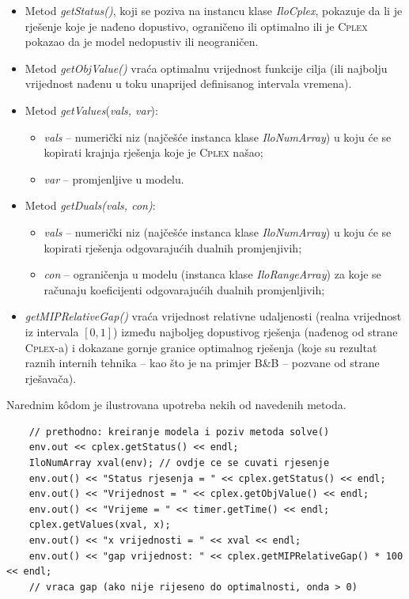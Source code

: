 \documentclass[a4paper, utf8, 11pt, colorlinks]{book}
\theoremstyle{definition}
\begin{document}
\begin{itemize}
	\item Metod \emph{getStatus()}, koji se poziva na instancu klase \emph{IloCplex},  pokazuje da li je rješenje koje je nađeno dopustivo, ograničeno ili optimalno ili je \textsc{Cplex} pokazao da je model nedopustiv ili neograničen.
	\item Metod \emph{getObjValue()} vraća optimalnu vrijednost funkcije cilja (ili najbolju vrijednost nađenu u toku unaprijed definisanog intervala vremena).
	\item Metod \emph{getValues}(\emph{vals, var}): 
	\begin{itemize}
	 	  \item \emph{vals} -- numerički niz (najčešće instanca klase \emph{IloNumArray}) u koju će se kopirati krajnja rješenja koje je \textsc{Cplex} našao;    
          \item \emph{var} -- promjenljive u modelu.
    \end{itemize}
     \item Metod \emph{getDuals(vals, con)}:
     \begin{itemize}
     	\item \emph{vals} -- numerički niz (najčešće instanca klase \emph{IloNumArray}) u koju će se kopirati rješenja odgovarajućih dualnih promjenjivih;
     	\item \emph{con} -- ograničenja u modelu (instanca klase \emph{IloRangeArray}) za koje se računaju koeficijenti odgovarajućih dualnih promjenljivih;
     	   \end{itemize}
     	\item \emph{getMIPRelativeGap()} vraća vrijednost relativne udaljenosti (realna vrijednost iz intervala $[0, 1]$) između najboljeg dopustivog rješenja (nađenog od strane \textsc{Cplex}-a) i dokazane gornje granice optimalnog rješenja (koje su rezultat raznih internih tehnika -- kao što je na primjer B\&B -- pozvane od strane rješavača).
  
\end{itemize}

Narednim k\^odom je ilustrovana upotreba nekih od navedenih metoda.
	\begin{verbatim}
	// prethodno: kreiranje modela i poziv metoda solve()
	env.out << cplex.getStatus() << endl;
	IloNumArray xval(env); // ovdje ce se cuvati rjesenje
	env.out() << "Status rjesenja = " << cplex.getStatus() << endl;
	env.out() << "Vrijednost = " << cplex.getObjValue() << endl;
	env.out() << "Vrijeme = " << timer.getTime() << endl;
	cplex.getValues(xval, x);
	env.out() << "x vrijednosti = " << xval << endl;
	env.out() << "gap vrijednost: " << cplex.getMIPRelativeGap() * 100 << endl; 
	// vraca gap (ako nije rijeseno do optimalnosti, onda > 0)
\end{verbatim}
\end{document}
